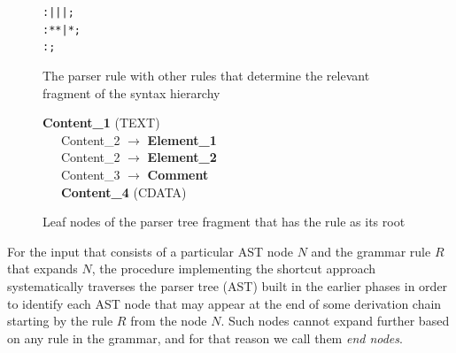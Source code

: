 \begin{figure}[ht]
\centering
\begin{framed}
\begin{alltt}
\small
   :  |  |  |  ;
   : \antlrliteral{<}  * \antlrliteral{>} * \antlrliteral{</}  \antlrliteral{>} | \antlrliteral{<}  * \antlrliteral{/>} ;
   : \antlrliteral{<!--}  \antlrliteral{-->} ;
\end{alltt}
\end{framed}
\caption{The parser rule  with other rules that determine the relevant fragment of the syntax hierarchy}
\label{fig:CONTENTHIERARCHY}
\end{figure}

\begin{figure}[ht]
\begin{framed}
\small
\textbf{Content{\_}1} (TEXT) \\
\ \ \ Content{\_}2 $\rightarrow$ \textbf{Element{\_}1} \\
\ \ \ Content{\_}2 $\rightarrow$ \textbf{Element{\_}2} \\
\ \ \ Content{\_}3 $\rightarrow$ \textbf{Comment} \\
\ \ \ \textbf{Content{\_}4} (CDATA)
\end{framed}
\caption{Leaf nodes of the parser tree fragment that has the  rule as its root}
\label{fig:CONTENTEXPAND}
\end{figure}

For the input that consists of a particular AST node $N$ and the grammar rule $R$ that expands $N$, the procedure implementing the shortcut approach systematically traverses the parser tree (AST) built in the earlier phases in order to identify each AST node that may appear at the end of some derivation chain starting by the rule $R$ from the node $N$.
Such nodes cannot expand further based on any rule in the grammar, and for that reason we call them \emph{end nodes}. 

